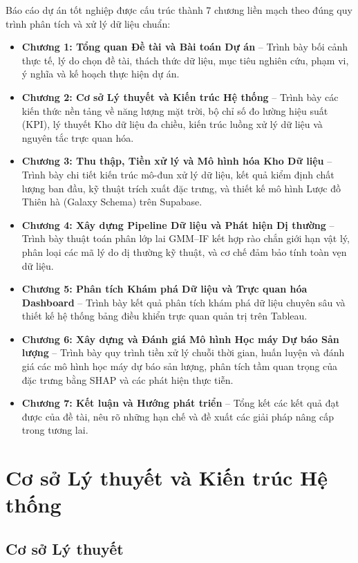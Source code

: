 \documentclass[12pt, a4paper]{report}
\begin{document}
Báo cáo dự án tốt nghiệp được cấu trúc thành 7 chương liền mạch theo đúng quy trình phân tích và xử lý dữ liệu chuẩn:
\begin{itemize}[noitemsep]
    \item \textbf{Chương 1: Tổng quan Đề tài và Bài toán Dự án} -- Trình bày bối cảnh thực tế, lý do chọn đề tài, thách thức dữ liệu, mục tiêu nghiên cứu, phạm vi, ý nghĩa và kế hoạch thực hiện dự án.
    \item \textbf{Chương 2: Cơ sở Lý thuyết và Kiến trúc Hệ thống} -- Trình bày các kiến thức nền tảng về năng lượng mặt trời, bộ chỉ số đo lường hiệu suất (KPI), lý thuyết Kho dữ liệu đa chiều, kiến trúc luồng xử lý dữ liệu và nguyên tắc trực quan hóa.
    \item \textbf{Chương 3: Thu thập, Tiền xử lý và Mô hình hóa Kho Dữ liệu} -- Trình bày chi tiết kiến trúc mô-đun xử lý dữ liệu, kết quả kiểm định chất lượng ban đầu, kỹ thuật trích xuất đặc trưng, và thiết kế mô hình Lược đồ Thiên hà (Galaxy Schema) trên Supabase.
    \item \textbf{Chương 4: Xây dựng Pipeline Dữ liệu và Phát hiện Dị thường} -- Trình bày thuật toán phân lớp lai GMM--IF kết hợp rào chắn giới hạn vật lý, phân loại các mã lý do dị thường kỹ thuật, và cơ chế đảm bảo tính toàn vẹn dữ liệu.
    \item \textbf{Chương 5: Phân tích Khám phá Dữ liệu và Trực quan hóa Dashboard} -- Trình bày kết quả phân tích khám phá dữ liệu chuyên sâu và thiết kế hệ thống bảng điều khiển trực quan quản trị trên Tableau.
    \item \textbf{Chương 6: Xây dựng và Đánh giá Mô hình Học máy Dự báo Sản lượng} -- Trình bày quy trình tiền xử lý chuỗi thời gian, huấn luyện và đánh giá các mô hình học máy dự báo sản lượng, phân tích tầm quan trọng của đặc trưng bằng SHAP và các phát hiện thực tiễn.
    \item \textbf{Chương 7: Kết luận và Hướng phát triển} -- Tổng kết các kết quả đạt được của đề tài, nêu rõ những hạn chế và đề xuất các giải pháp nâng cấp trong tương lai.
\end{itemize}

\newpage
\chapter{Cơ sở Lý thuyết và Kiến trúc Hệ thống}
\label{chap:lythuyet}

\section{Cơ sở Lý thuyết}
\label{sec:co_so_ly_thuyet}
\end{document}
